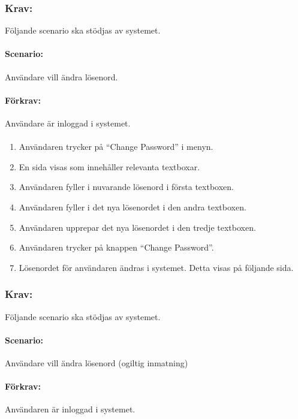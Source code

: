 \documentclass[paper=a4, fontsize=11pt,twoside]{article}
\begin{document}
 \subsubsection*{Krav:} Följande scenario ska stödjas av systemet.
 \paragraph{Scenario:}Användare vill ändra lösenord.
 \paragraph{Förkrav:}
 Användare är inloggad i systemet.
 \paragraph{}
 \begin{enumerate}
 \item	Användaren trycker på “Change Password” i menyn.
 \item	En sida visas som innehåller relevanta textboxar.
 \item	Användaren fyller i nuvarande lösenord i första textboxen.
 \item	Användaren fyller i det nya lösenordet i den andra textboxen.
 \item	Användaren upprepar det nya lösenordet i den tredje textboxen.
 \item	Användaren trycker på knappen “Change Password”.
 \item	Lösenordet för användaren ändras i systemet. Detta visas på följande sida.
 	
 \end{enumerate}
 
  \subsubsection*{Krav:}Följande scenario ska stödjas av systemet.
  \paragraph{Scenario:}Användare vill ändra lösenord (ogiltig inmatning)
  \paragraph{Förkrav:}
Användaren är inloggad i systemet.
\end{document}
